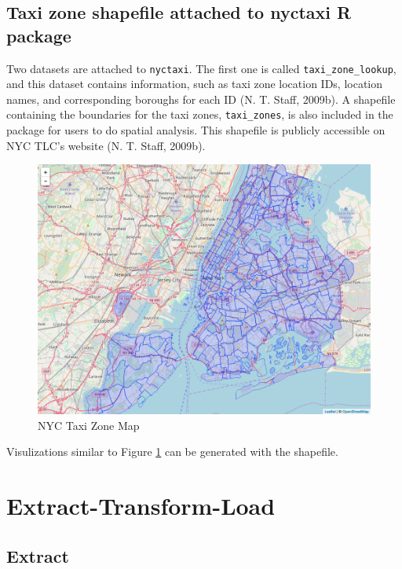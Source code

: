 \documentclass[12pt,twoside]{reedthesis}
\theoremstyle{definition}
\theoremstyle{definition}
\theoremstyle{definition}
\theoremstyle{remark}
\begin{document}
\subsection{\texorpdfstring{Taxi zone shapefile attached to nyctaxi
\textbf{R}
package}{Taxi zone shapefile attached to nyctaxi R package}}\label{taxi-zone-shapefile-attached-to-nyctaxi-r-package}

Two datasets are attached to \texttt{nyctaxi}. The first one is called
\texttt{taxi\_zone\_lookup}, and this dataset contains information, such
as taxi zone location IDs, location names, and corresponding boroughs
for each ID (N. T. Staff, 2009b). A shapefile containing the boundaries
for the taxi zones, \texttt{taxi\_zones}, is also included in the
package for users to do spatial analysis. This shapefile is publicly
accessible on NYC TLC's website (N. T. Staff, 2009b).
\begin{figure}

{\centering \includegraphics[width=5.84in]{figure/zonemap} 

}

\caption{NYC Taxi Zone Map}\label{fig:zonemap}
\end{figure}
Visulizations similar to Figure \ref{fig:zonemap} can be generated with
the shapefile.

\section{Extract-Transform-Load}\label{extract-transform-load}

\subsection{Extract}\label{extract}
\end{document}
